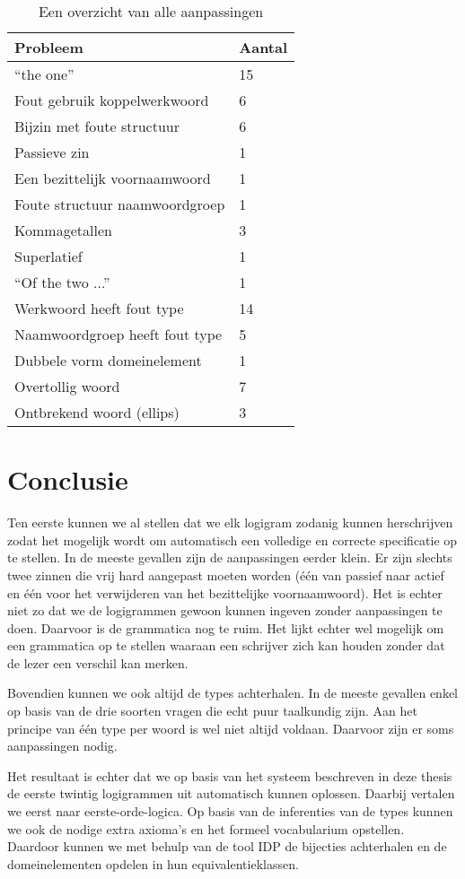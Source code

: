 \begin{table}[h]
  \centering
  \begin{tabular}{ll}
    \toprule
    \textbf{Probleem} & \textbf{Aantal} \\ 
    \hline
    ``the one'' & 15 \\
    Fout gebruik koppelwerkwoord & 6 \\
    Bijzin met foute structuur & 6 \\
    Passieve zin & 1 \\
    Een bezittelijk voornaamwoord & 1 \\
    Foute structuur naamwoordgroep & 1 \\
    \hline
    Kommagetallen & 3 \\
    Superlatief & 1 \\
    ``Of the two ...'' & 1 \\
    \hline
    Werkwoord heeft fout type & 14 \\
    Naamwoordgroep heeft fout type & 5 \\
    \hline
    Dubbele vorm domeinelement & 1 \\
    \hline
    Overtollig woord & 7 \\
    Ontbrekend woord (ellips) & 3 \\
    \bottomrule
  \end{tabular}
  \caption{Een overzicht van alle aanpassingen}
  \label{tbl:resultaten}
\end{table}

\section{Conclusie}
Ten eerste kunnen we al stellen dat we elk logigram zodanig kunnen herschrijven zodat het mogelijk wordt om automatisch een volledige en correcte specificatie op te stellen. In de meeste gevallen zijn de aanpassingen eerder klein. Er zijn slechts twee zinnen die vrij hard aangepast moeten worden (één van passief naar actief en één voor het verwijderen van het bezittelijke voornaamwoord). Het is echter niet zo dat we de logigrammen gewoon kunnen ingeven zonder aanpassingen te doen. Daarvoor is de grammatica nog te ruim. Het lijkt echter wel mogelijk om een grammatica op te stellen waaraan een schrijver zich kan houden zonder dat de lezer een verschil kan merken.

Bovendien kunnen we ook altijd de types achterhalen. In de meeste gevallen enkel op basis van de drie soorten vragen die echt puur taalkundig zijn. Aan het principe van één type per woord is wel niet altijd voldaan. Daarvoor zijn er soms aanpassingen nodig.

Het resultaat is echter dat we op basis van het systeem beschreven in deze thesis de eerste twintig logigrammen uit \cite{logigrammen} automatisch kunnen oplossen. Daarbij vertalen we eerst naar eerste-orde-logica. Op basis van de inferenties van de types kunnen we ook de nodige extra axioma's en het formeel vocabularium opstellen. Daardoor kunnen we met behulp van de tool IDP \cite{IDP} de bijecties achterhalen en de domeinelementen opdelen in hun equivalentieklassen.
